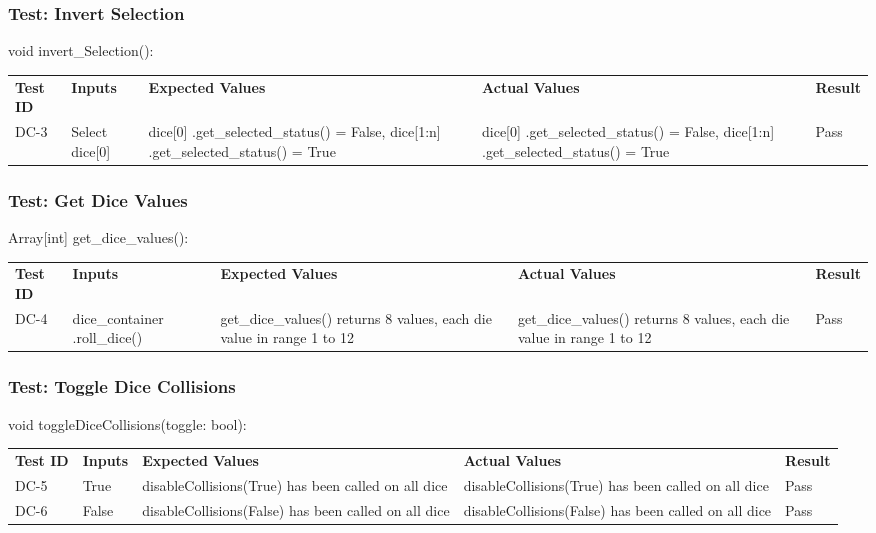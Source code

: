 \documentclass[12pt, titlepage]{article}
\begin{document}
\subsubsection{Test: Invert Selection}
void invert\_Selection():\\
\begin{tabularx}{\textwidth}{|p{2cm}|p{2.5cm}|p{3.75cm}|p{3.75cm}|p{1.5cm}|}
    \cline{1-5}
    \textbf{Test ID} & \textbf{Inputs} & \textbf{Expected Values} & \textbf{Actual Values} & \textbf{Result} \\
    \cline{1-5}
    DC-3 & Select dice[0] & dice[0] .get\_selected\_status() = False, dice[1:n] .get\_selected\_status() = True & dice[0] .get\_selected\_status() = False, dice[1:n] .get\_selected\_status() = True & Pass \\
    \cline{1-5}
\end{tabularx}

\subsubsection{Test: Get Dice Values}
Array[int] get\_dice\_values():\\
\begin{tabularx}{\textwidth}{|p{2cm}|p{2.5cm}|p{3.75cm}|p{3.75cm}|p{1.5cm}|}
    \cline{1-5}
    \textbf{Test ID} & \textbf{Inputs} & \textbf{Expected Values} & \textbf{Actual Values} & \textbf{Result} \\
    \cline{1-5}
    DC-4 & dice\_container .roll\_dice() & get\_dice\_values() returns 8 values, each die value in range 1 to 12 & get\_dice\_values() returns 8 values, each die value in range 1 to 12 & Pass \\
    \cline{1-5}
\end{tabularx}

\subsubsection{Test: Toggle Dice Collisions}
void toggleDiceCollisions(toggle: bool):\\
\begin{tabularx}{\textwidth}{|p{2cm}|p{2.0cm}|p{4cm}|p{4cm}|p{1.5cm}|}
    \cline{1-5}
    \textbf{Test ID} & \textbf{Inputs} & \textbf{Expected Values} & \textbf{Actual Values} & \textbf{Result} \\
    \cline{1-5}
    DC-5 & True & disableCollisions(True) has been called on all dice & disableCollisions(True) has been called on all dice & Pass \\
    \cline{1-5}
    DC-6 & False & disableCollisions(False) has been called on all dice & disableCollisions(False) has been called on all dice & Pass \\
    \cline{1-5}
\end{tabularx}
\end{document}
